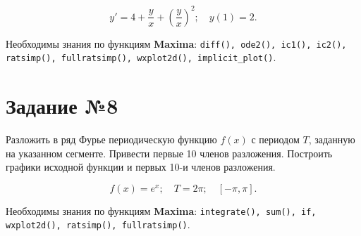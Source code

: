     \[
        y' = 4 + \frac{y}{x} + \left( \frac{y}{x} \right)^{2}; \quad y(1) = 2.
    \]

    Необходимы знания по функциям \textbf{Maxima}: {\tt diff(), ode2(), ic1(), ic2(), ratsimp(), fullratsimp(), wxplot2d(), implicit\_plot()}.

\section*{Задание №8}

    Разложить в ряд Фурье периодическую функцию $f(x)$ с периодом $T$, заданную на указанном сегменте. Привести первые 10 членов разложения. Построить графики исходной функции и первых 10-и членов разложения.

    \[
        f(x) = e^{x}; \quad T = 2 \pi; \quad [-\pi, \pi].
    \]

    Необходимы знания по функциям \textbf{Maxima}: {\tt integrate(), sum(), if, wxplot2d(), ratsimp(), fullratsimp()}.

    \newpage